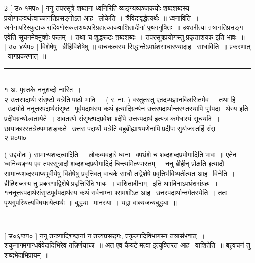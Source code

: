 \documentclass[11pt, openany]{book}
\begin{document}
\begin{multicols}{2}
 [ उ० १मप० ] ननु तपरसूत्रे शब्दानां ध्वनिरिति व्यङ्ग्यव्यञ्जकयोः शब्दशब्दस्य प्रयोगादन्वर्थत्वाच्चानतिप्रसङ्गोऽत आह \textendash\ लोकेति~। त्रैविद्यवृद्धेत्यर्थः~॥ ध्वनाविति~। अनेनापरिस्फुटाकारादिवर्णसकलशब्दपरिग्रहात्काकवाशितादीनां पृथगनुक्तिः~॥ उक्तरीत्या तत्रानतिप्रसङ्ग एवेति सूचनमेवमुक्तेः फलम्~। तथा च शुद्धरूढः शब्दशब्दः~। तपरसूत्रप्रयोगस्तु प्रकृताशयक इति भावः~॥\\

 [ उ० ४र्थप० ] विशेषेषु \textendash\ ब्रीहिविशेषेषु~॥ वाचकत्वस्य सिद्धान्तेऽपभ्रंशसाधारण्यादाह \textendash\ साधाविति~॥ प्रकरणात् \textendash\ यागप्रकरणात्~॥

\noindent
\rule{1\linewidth}{0.5pt}\\

१ अ. पुस्तके {\qt ननु}शब्दो नास्ति~। \\

२ उत्तरपदार्थः संसृष्टो यत्रेति पाठो भाति~। ( र. ना. ) वस्तुतस्तु एतदप्यज्ञानविलसितमेव~। तथा हि \textendash\ उदयोते {\qt ननूत्तरपदार्थसंसृष्ट} \textendash\ पूर्वपदार्थस्य कथं इत्यादिग्रन्थेन {\qt उत्तरपदार्थान्तरगतस्यापि पूर्वपदा \textendash\ र्थस्य इति प्रदीपग्रन्थोsवतार्यते~। अवतरणे संसृष्टपदप्रवेशः प्रदीपे उत्तरपदार्थ} इत्यत्र कर्मधारयं सूचयति~। छायाकारस्तत्रेत्थमाशङ्कते \textendash\ उत्तरः पदार्थो यत्रेति बहुब्रीह्याश्रयणेनापि प्रदीपः सुयोजस्तहिं संसृ \textendash\ \\

२ प्र०पा० 

\columnbreak

 ( उद्द्योतः ) सामान्यशब्दत्वादिति~। लोकव्यवहारे ध्वना \textendash\ वपभ्रंशे च शब्दशब्दप्रयोगादिति भावः~॥ एतेन ध्वनिव्यङ्ग्य एव तपरसू्त्रादौ शब्दशब्दप्रयोगादिदं चिन्त्यमित्यपास्तम्~। ननु {\qt ब्रीहीन् प्रोक्षति} इत्यादौ सामान्यशब्दस्याप्यपूर्वीयेषु विशेषेषु प्रवृत्तिवत् वाचके साधौ तद्विशेषे प्रवृत्तिर्भविष्यतीत्यत आह \textendash\ विनेति~। ब्रीहिशब्दस्य तु प्रकरणाद्विशेषे प्रवृत्तिरिति भावः~। वाशितादीनाम् \textendash\ इति आादिनाऽपभ्रंशसंग्रहः~॥ १ननूत्तरपदार्थसंसृष्टपूर्वपदार्थस्य कथं सर्वनाम्ना परामर्शोऽत आह \textendash\ उत्तरपदार्थान्तर्गतस्येति~। ततः पृथगुपस्थित्यविषयस्येत्यर्थः~॥ बुद्ध्या \textendash\ मानस्या~। यद्वा वाक्यजन्यबुद्ध्या~॥\\

\noindent
\rule{1\linewidth}{0.5pt}\\

 [ उ०६ष्ठप० ] ननु तन्त्र्यादिशब्दानां न तत्त्वप्रसङ्गः, प्रकृत्यादिविभागस्य तत्रासंभवात्~। शकुनागमगान्धर्ववेदादिभिरेव तन्निर्णयाच्च~॥ अत एव कैयटे {\qt मत्वा} इत्युक्तिरत आह \textendash\ वाशितेति~॥ बहुवचनं तु शब्दभेदाभिप्रायम्~॥\\


\end{multicols}
\end{document}
